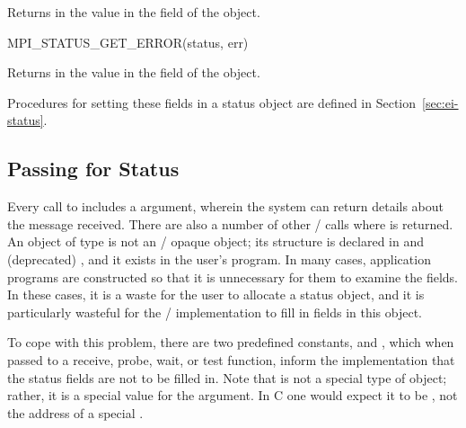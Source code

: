 Returns in  the value in the  field of the  object.


%
\begin{funcdef}{MPI\_STATUS\_GET\_ERROR}{(\mbox{status}, \mbox{err})}
\end{funcdef}

Returns in  the value in the  field of the  object.

Procedures for setting these fields in a status object are defined in Section~\ref{sec:ei-status}.

\subsection{Passing \texorpdfstring{}{MPI\_STATUS\_IGNORE} for Status}
\label{sec:pt2pt-status-ignore}

Every call to  includes a  argument, wherein
the system can return details about the message received.
There are also a number of other \MPI/ calls
where  is returned.
An object of type
is not an \mpi/ opaque object; its structure is declared
in  and (deprecated) , and it exists in the user's program.  In many
cases, application programs are constructed so that it is unnecessary for them
to examine the  fields.  In these cases, it is a waste for the user
to allocate a status object, and it is particularly wasteful for the \mpi/
implementation to fill in fields in this object.


To cope with this problem, there are two predefined constants,
 and
,
which when
passed to a receive,
probe,
wait, or test function, inform the implementation that
the status fields are not to be filled in.  Note that
 is not a special type of 
object; rather, it is a special value for the argument.  In C one would expect
it to be , not the address of a special .

